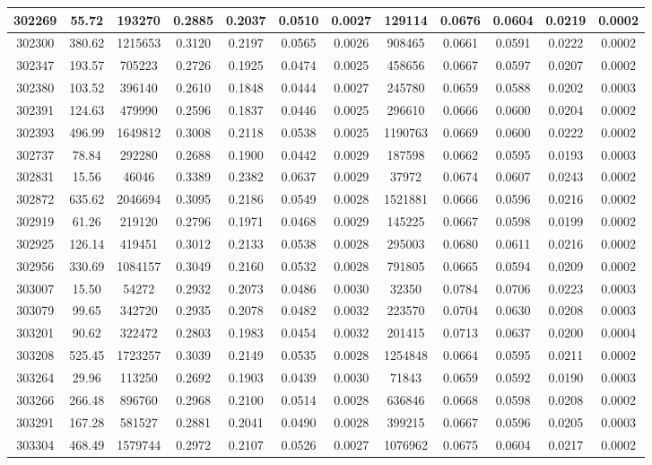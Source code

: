 \documentclass[10pt]{extarticle}
\begin{document}
\begin{longtable}{|c|c|c|c|c|c|c|c|c|c|c|c|}
\hline 
302269&55.72&193270&0.2885&0.2037&0.0510&0.0027&129114&0.0676&0.0604&0.0219&0.0002 \\ 
\hline 
302300&380.62&1215653&0.3120&0.2197&0.0565&0.0026&908465&0.0661&0.0591&0.0222&0.0002 \\ 
\hline 
302347&193.57&705223&0.2726&0.1925&0.0474&0.0025&458656&0.0667&0.0597&0.0207&0.0002 \\ 
\hline 
302380&103.52&396140&0.2610&0.1848&0.0444&0.0027&245780&0.0659&0.0588&0.0202&0.0003 \\ 
\hline 
302391&124.63&479990&0.2596&0.1837&0.0446&0.0025&296610&0.0666&0.0600&0.0204&0.0002 \\ 
\hline 
302393&496.99&1649812&0.3008&0.2118&0.0538&0.0025&1190763&0.0669&0.0600&0.0222&0.0002 \\ 
\hline 
302737&78.84&292280&0.2688&0.1900&0.0442&0.0029&187598&0.0662&0.0595&0.0193&0.0003 \\ 
\hline 
302831&15.56&46046&0.3389&0.2382&0.0637&0.0029&37972&0.0674&0.0607&0.0243&0.0002 \\ 
\hline 
302872&635.62&2046694&0.3095&0.2186&0.0549&0.0028&1521881&0.0666&0.0596&0.0216&0.0002 \\ 
\hline 
302919&61.26&219120&0.2796&0.1971&0.0468&0.0029&145225&0.0667&0.0598&0.0199&0.0002 \\ 
\hline 
302925&126.14&419451&0.3012&0.2133&0.0538&0.0028&295003&0.0680&0.0611&0.0216&0.0002 \\ 
\hline 
302956&330.69&1084157&0.3049&0.2160&0.0532&0.0028&791805&0.0665&0.0594&0.0209&0.0002 \\ 
\hline 
303007&15.50&54272&0.2932&0.2073&0.0486&0.0030&32350&0.0784&0.0706&0.0223&0.0003 \\ 
\hline 
303079&99.65&342720&0.2935&0.2078&0.0482&0.0032&223570&0.0704&0.0630&0.0208&0.0003 \\ 
\hline 
303201&90.62&322472&0.2803&0.1983&0.0454&0.0032&201415&0.0713&0.0637&0.0200&0.0004 \\ 
\hline 
303208&525.45&1723257&0.3039&0.2149&0.0535&0.0028&1254848&0.0664&0.0595&0.0211&0.0002 \\ 
\hline 
303264&29.96&113250&0.2692&0.1903&0.0439&0.0030&71843&0.0659&0.0592&0.0190&0.0003 \\ 
\hline 
303266&266.48&896760&0.2968&0.2100&0.0514&0.0028&636846&0.0668&0.0598&0.0208&0.0002 \\ 
\hline 
303291&167.28&581527&0.2881&0.2041&0.0490&0.0028&399215&0.0667&0.0596&0.0205&0.0003 \\ 
\hline 
303304&468.49&1579744&0.2972&0.2107&0.0526&0.0027&1076962&0.0675&0.0604&0.0217&0.0002 \\ 

\end{longtable}
\end{document}
